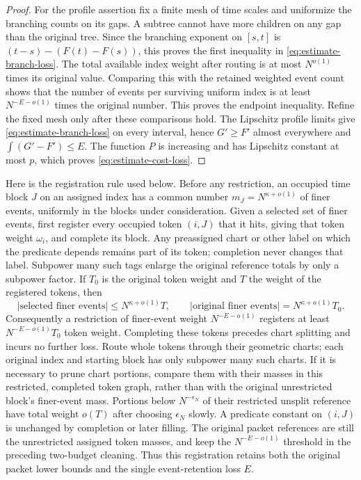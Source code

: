 \begin{proof}
For the profile assertion fix a finite mesh of time scales and
uniformize the branching counts on its gaps. A subtree cannot have
more children on any gap than the original tree. Since the branching
exponent on $[s,t]$ is $(t-s)-(F(t)-F(s))$, this proves the first
inequality in \eqref{eq:estimate-branch-loss}. The total available
index weight after routing is at most $N^{o(1)}$ times its original
value. Comparing this with the retained weighted event count shows
that the number of events per surviving uniform index is at least
$N^{-E-o(1)}$ times the original number. This proves the endpoint
inequality. Refine the fixed mesh only after these comparisons hold.
The Lipschitz profile limits give \eqref{eq:estimate-branch-loss} on
every interval, hence $G'\ge F'$ almost everywhere and
$\int(G'-F')\le E$. The function $P$ is increasing and has Lipschitz
constant at most $p$, which proves \eqref{eq:estimate-cost-loss}.
\end{proof}

Here is the registration rule used below. Before any restriction, an
occupied time block $J$ on an assigned index has a common number
$m_J=N^{\kappa+o(1)}$ of finer events, uniformly in the blocks under
consideration. Given a selected set of finer events, first register
every occupied token $(i,J)$ that it hits, giving that token weight
$\omega_i$, and complete its block. Any preassigned chart or other
label on which the predicate depends remains part of its token;
completion never changes that label. Subpower many such tags enlarge
the original reference totals by only a subpower factor. If $T_0$ is the original token
weight and $T$ the weight of the registered tokens, then
\[
 |\text{selected finer events}|
 \le N^{\kappa+o(1)}T,\qquad
 |\text{original finer events}|=N^{\kappa+o(1)}T_0.
\]
Consequently a restriction of finer-event weight $N^{-E-o(1)}$
registers at least $N^{-E-o(1)}T_0$ token weight. Completing these
tokens precedes chart splitting and incurs no further loss. Route
whole tokens through their geometric charts; each original index and
starting block has only subpower many such charts. If it is necessary
to prune chart portions, compare them with their masses in this
restricted, completed token graph, rather than with the original
unrestricted block's finer-event mass. Portions below
$N^{-\epsilon_N}$ of their restricted unsplit reference have total
weight $o(T)$ after choosing $\epsilon_N$ slowly. A predicate constant
on $(i,J)$ is unchanged by completion or later filling. The original
packet references are still the unrestricted assigned token masses,
and keep the $N^{-E-o(1)}$ threshold in the preceding two-budget
cleaning. Thus this registration retains both the original packet
lower bounds and the single event-retention loss $E$.

